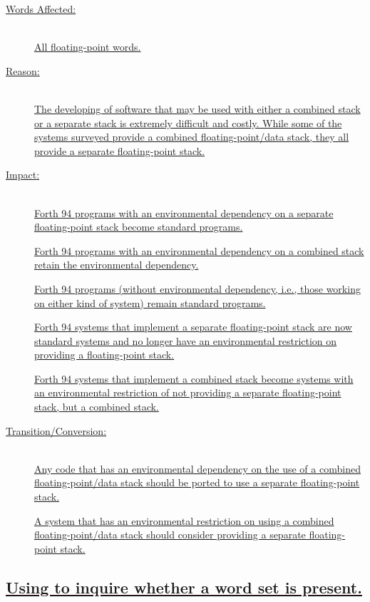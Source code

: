 \begin{description}
\item[\uline{Words Affected:}] ~\\
	\uline{All floating-point words.}

\item[\uline{Reason:}] ~\\
	\uline{The developing of software that may be used with either a combined
	stack or a separate stack is extremely difficult and costly.  While
	some of the systems surveyed provide a combined floating-point/data
	stack, they all provide a separate floating-point stack.}

\item[\uline{Impact:}] ~\\
	\uline{Forth 94 programs with an environmental dependency on a separate
	floating-point stack become standard programs.}

	\uline{Forth 94 programs with an environmental dependency on a combined
	stack retain the environmental dependency.}

	\uline{Forth 94 programs (without environmental dependency, i.e., those
	working on either kind of system) remain standard programs.}

	\uline{Forth 94 systems that implement a separate floating-point stack
	are now standard systems and no longer have an environmental restriction
	on providing a floating-point stack.}

	\uline{Forth 94 systems that implement a combined stack become systems
	with an environmental restriction of not providing a separate
	floating-point stack, but a combined stack.}

\item[\uline{Transition/Conversion:}] ~\\
	\uline{Any code that has an environmental dependency on the use of a
	combined floating-point/data stack should be ported to use a separate
	floating-point stack.}

	\uline{A system that has an environmental restriction on using a
	combined floating-point/data stack should consider providing a separate
	floating-point stack.}
\end{description}


\subsection[Using \word{ENVIRONMENT?} to inquire whether a word set is present.]{\uline{Using  to inquire whether a word set is present.}} %
\label{diff:environment}

